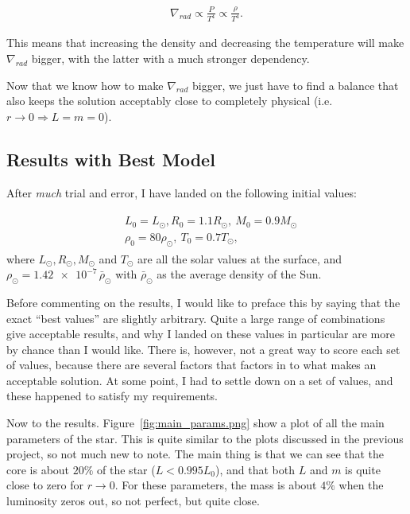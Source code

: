 \documentclass[11pt]{article}
\begin{document}
\begin{align*}
    \nabla_{rad} \propto \frac{P}{T^4} \propto \frac{\rho}{T^4}.
\end{align*}

This means that increasing the density and decreasing the temperature will make $\nabla_{rad}$ bigger, with the latter with a much stronger dependency.

Now that we know how to make $\nabla_{rad}$ bigger, we just have to find a balance that also keeps the solution acceptably close to completely physical (i.e. $r\rightarrow 0\Rightarrow L = m = 0$).

\subsection{Results with Best Model}
\label{sub:Results with Best Model}


After \emph{much} trial and error, I have landed on the following initial values:

\begin{align}
    \begin{split}
        &L_0 = L_\odot, R_0 = 1.1R_\odot,\ M_0 = 0.9M_\odot\\
        &\rho_0=80\rho_\odot,\ T_0 = 0.7 T_\odot,
    \end{split}\label{eq:best-param}
\end{align}
where $L_\odot, R_\odot, M_\odot$ and $T_\odot$ are all the solar values at the surface, and $\rho_\odot = \num{1.42e-7}\,\bar\rho_\odot$ with $\bar\rho_\odot$ as the average density of the Sun.

Before commenting on the results, I would like to preface this by saying that the exact ``best values'' are slightly arbitrary. Quite a large range of combinations give acceptable results, and why I landed on these values in particular are more by chance than I would like. There is, however, not a great way to score each set of values, because there are several factors that factors in to what makes an acceptable solution. At some point, I had to settle down on a set of values, and these happened to satisfy my requirements.


Now to the results. Figure~\ref{fig:main_params.png} show a plot of all the main parameters of the star. This is quite similar to the plots discussed in the previous project, so not much new to note. The main thing is that we can see that the core is about $20\%$ of the star ($L<0.995L_0$), and that both $L$ and $m$ is quite close to zero for $r\rightarrow 0$. For these parameters, the mass is about $4\%$ when the luminosity zeros out, so not perfect, but quite close.
\end{document}

